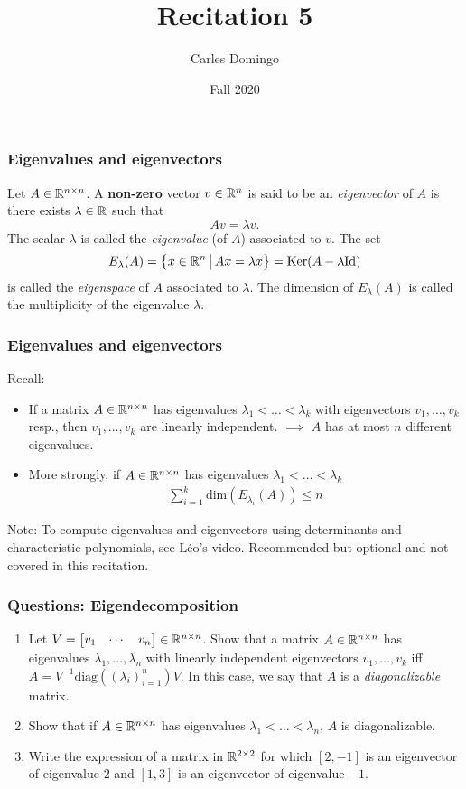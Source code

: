 \documentclass{beamer}
\title{Recitation 5}
\author{Carles Domingo}
\date{Fall 2020}
\begin{document}
\frame{\titlepage} 

\setcounter{showProgressBar}{0}
\setcounter{showSlideNumbers}{1}

\begin{frame}[t]
\frametitle{Eigenvalues and eigenvectors}
\begin{definition}\label{def:eigen}
	Let $A \in \mathbb{R}^{n \times n}$. A \textbf{non-zero} vector $v \in \mathbb{R}^n$ is said to be an \emph{eigenvector} of $A$ is there exists $\lambda \in \mathbb{R}$ such that
	$$
	A v = \lambda v.
	$$
	The scalar $\lambda$ is called the \emph{eigenvalue} (of $A$) associated to $v$. The set
	$$
	E_{\lambda}(A) = \big\{ x \in \mathbb{R}^n \, \big| \, Ax = \lambda x \big\} = {{\rm Ker}}(A-\lambda {{\rm Id}})
	$$
	is called the \emph{eigenspace} of $A$ associated to $\lambda$. The dimension of $E_{\lambda}(A)$ is called the multiplicity of the eigenvalue $\lambda$.
\end{definition}
\end{frame}

\begin{frame}[t]
\frametitle{Eigenvalues and eigenvectors}
Recall: 
\begin{itemize}
\item If a matrix $A \in \mathbb{R}^{n \times n}$ has eigenvalues $\lambda_1 < \dots < \lambda_k$ with eigenvectors $v_1, \dots, v_k$ resp., then $v_1, \dots, v_k$ are linearly independent. $\implies$ $A$ has at most $n$ different eigenvalues.
\item More strongly, if $A \in \mathbb{R}^{n \times n}$ has eigenvalues $\lambda_1 < \dots < \lambda_k$
\begin{align*}
\sum_{i=1}^k \text{dim}(E_{\lambda_i}(A)) \leq n
\end{align*}
\end{itemize}
Note: To compute eigenvalues and eigenvectors using determinants and characteristic polynomials, see L\'eo's video. Recommended but optional and not covered in this recitation.
\end{frame}

\begin{frame}[t]
\frametitle{Questions: Eigendecomposition}
\begin{enumerate}
\item Let $V = \begin{bmatrix} v_1 & \cdots & v_n \end{bmatrix} \in \mathbb{R}^{n \times n}$. Show that a matrix $A \in \mathbb{R}^{n \times n}$ has eigenvalues $\lambda_1, \dots, \lambda_n$ with linearly independent eigenvectors $v_1, \dots, v_k$ iff $A = V^{-1} \text{diag}((\lambda_i)_{i=1}^n) V$. In this case, we say that $A$ is a \emph{diagonalizable} matrix.
\item Show that if $A \in \mathbb{R}^{n \times n}$ has eigenvalues $\lambda_1 < \dots < \lambda_n$, $A$ is diagonalizable.
\item Write the expression of a matrix in $\mathbb{R}^{2 \times 2}$ for which $[2,-1]$ is an eigenvector of eigenvalue $2$ and $[1,3]$ is an eigenvector of eigenvalue $-1$.
\end{enumerate}
\end{frame}
\end{document}
